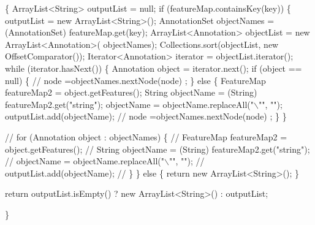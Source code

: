 \begin{DoxyCode}
                                               \{
        ArrayList<String> outputList = null;
        \textcolor{keywordflow}{if} (featureMap.containsKey(key)) \{
            outputList = \textcolor{keyword}{new} ArrayList<String>();
            AnnotationSet objectNames = (AnnotationSet) featureMap.get(key);
            ArrayList<Annotation> objectList = \textcolor{keyword}{new} ArrayList<Annotation>(
                    objectNames);
            Collections.sort(objectList, \textcolor{keyword}{new} OffsetComparator());
            Iterator<Annotation> iterator = objectList.iterator();
            \textcolor{keywordflow}{while} (iterator.hasNext()) \{
                Annotation \textcolor{keywordtype}{object} = iterator.next();
                \textcolor{keywordflow}{if} (\textcolor{keywordtype}{object} == null) \{
                    \textcolor{comment}{// node =objectNames.nextNode(node) ;}
                \} \textcolor{keywordflow}{else} \{
                    FeatureMap featureMap2 = \textcolor{keywordtype}{object}.getFeatures();
                    String objectName = (String) featureMap2.get(\textcolor{stringliteral}{"string"});
                    objectName = objectName.replaceAll(\textcolor{stringliteral}{"\(\backslash\)""}, \textcolor{stringliteral}{""});
                    outputList.add(objectName);
                    \textcolor{comment}{// node =objectNames.nextNode(node) ;}
                \}
            \}

            \textcolor{comment}{// for (Annotation object : objectNames) \{}
            \textcolor{comment}{// FeatureMap featureMap2 = object.getFeatures();}
            \textcolor{comment}{// String objectName = (String) featureMap2.get("string");}
            \textcolor{comment}{// objectName = objectName.replaceAll("\(\backslash\)"", "");}
            \textcolor{comment}{// outputList.add(objectName);}
            \textcolor{comment}{// \}}
        \} \textcolor{keywordflow}{else} \{
            \textcolor{keywordflow}{return} \textcolor{keyword}{new} ArrayList<String>();
        \}

        \textcolor{keywordflow}{return} outputList.isEmpty() ? \textcolor{keyword}{new} ArrayList<String>() : outputList;

    \}
\end{DoxyCode}


